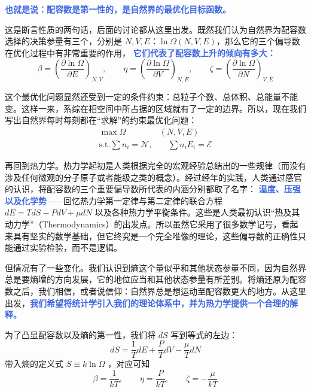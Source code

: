 \textcolor{RoyalBlue}{\textbf{\kaishu 也就是说：配容数是第一性的，是自然界的最优化目标函数。}}

这是断言性质的两句话，后面的讨论都从这里出发。既然我们认为自然界为配容数选择的决策参量有三个，分别是 $N,V,E$：$\ln\Omega(N,V,E)$，那么它的三个偏导数在优化过程中有非常重要的作用， \textcolor{RoyalBlue}{\textbf{\kaishu 它们代表了配容数上升的倾向有多大：}} 
\begin{equation}
    \beta = \left(\frac{\partial \ln\Omega}{\partial E}\right)_{N,V},\quad\quad \eta = \left(\frac{\partial \ln\Omega}{\partial V}\right)_{N,E},\quad\quad \zeta = \left(\frac{\partial \ln\Omega}{\partial N}\right)_{V,E}
\end{equation}

这个最优化问题显然还受到一定的条件约束：总粒子个数、总体积、总能量不能变。这样一来，系综在相空间中所占据的区域就有了一定的边界。所以，现在我们写出自然界每时每刻都在“求解”的约束最优化问题：
\begin{equation}\label{equ:optimizeI}
    \begin{split}
        \max \Omega&(N,V,E)\\
        \text{s.t.}\sum n_i = \mathcal{N},&\quad\sum n_iE_i = \mathcal{E}
    \end{split}
\end{equation}

再回到热力学。热力学起初是人类根据完全的宏观经验总结出的一些规律（而没有涉及任何微观的分子原子或者能级之类的概念）。经过经年的实践，人类通过感官的认识，将配容数的三个重要偏导数所代表的内涵分别都取了名字： \textcolor{RoyalBlue}{\textbf{\kaishu 温度、压强以及化学势}}——回忆热力学第一定律与第二定律的联合方程 $dE = TdS - PdV+ \mu dN$ 以及各种热力学平衡条件。这些是人类最初认识“热及其动力学”（Thermodynamics）的出发点。所以虽然它采用了很多数学记号，看起来具有坚实的数学基础，但它终究是一个完全唯像的理论，这些偏导数的正确性只能通过实验检验，而不是逻辑。

但情况有了一些变化。我们认识到熵这个量似乎和其他状态参量不同，因为自然界总是要熵增的方向发展，它的地位应当和其他状态参量有所差别。将熵还原为配容数之后，我们相信，或者说信仰：自然界总是想运动至配容数更大的地方。从这里出发，\textcolor{RoyalBlue}{\textbf{\kaishu 我们希望将统计学引入我们的理论体系中，并为热力学提供一个合理的解释。}} 

为了凸显配容数以及熵的第一性，我们将 $dS$ 写到等式的左边：
\begin{equation}
    dS = \frac{1}{T} dE + \frac{P}{T} dV - \frac{\mu}{T} dN
\end{equation}
带入熵的定义式 $S \equiv k\ln \Omega$ ，对应可知
\begin{equation}
    \beta = \frac{1}{kT} ,\quad\quad \eta = \frac{P}{kT} ,\quad\quad \zeta = -\frac{\mu}{kT} 
\end{equation}

